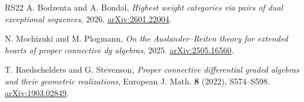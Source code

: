 \documentclass[11pt,a4paper]{article}
\theoremstyle{plain}
\theoremstyle{definition}
\numberwithin{equation}{section}
\begin{document}
\begin{thebibliography}{RS22}
 A. Bodzenta and A. Bondal,
\emph{Highest weight categories via pairs of dual exceptional sequences},
2026. \href{https://arxiv.org/abs/2601.22004}{arXiv:2601.22004}.

 N. Mochizuki and M. Plogmann,
\emph{On the Auslander--Reiten theory for extended hearts of proper
connective dg algebras}, 2025.
\href{https://arxiv.org/abs/2505.16560}{arXiv:2505.16560}.

 T. Raedschelders and G. Stevenson,
\emph{Proper connective differential graded algebras and their geometric
realizations}, European J. Math. \textbf{8} (2022), S574--S598.
\href{https://arxiv.org/abs/1903.02849}{arXiv:1903.02849}.

\end{thebibliography}
\end{document}
